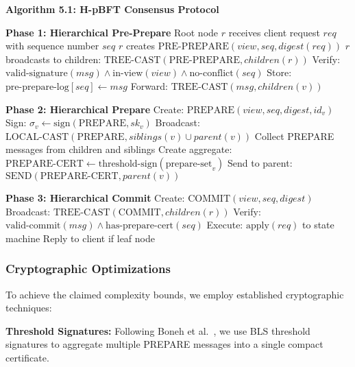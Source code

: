 \documentclass[conference]{IEEEtran}
\begin{document}
\textbf{Algorithm 5.1: H-pBFT Consensus Protocol}

\begin{algorithmic}[1]
\STATE \textbf{Phase 1: Hierarchical Pre-Prepare}
\STATE Root node $r$ receives client request $req$ with sequence number $seq$
\STATE $r$ creates $\text{PRE-PREPARE}(view, seq, digest(req))$ 
\STATE $r$ broadcasts to children: $\text{TREE-CAST}(\text{PRE-PREPARE}, children(r))$
    \STATE Verify: $\text{valid-signature}(msg) \land \text{in-view}(view) \land \text{no-conflict}(seq)$
    \STATE Store: $\text{pre-prepare-log}[seq] \gets msg$
    \STATE Forward: $\text{TREE-CAST}(msg, children(v))$
\ENDFOR

\STATE \textbf{Phase 2: Hierarchical Prepare}
    \STATE Create: $\text{PREPARE}(view, seq, digest, id_v)$
    \STATE Sign: $\sigma_v \gets \text{sign}(\text{PREPARE}, sk_v)$
    \STATE Broadcast: $\text{LOCAL-CAST}(\text{PREPARE}, siblings(v) \cup parent(v))$
\ENDFOR
{}
        \STATE Collect PREPARE messages from children and siblings
    \ENDWHILE
    \STATE Create aggregate: $\text{PREPARE-CERT} \gets \text{threshold-sign}(\text{prepare-set}_v)$
    \STATE Send to parent: $\text{SEND}(\text{PREPARE-CERT}, parent(v))$
\ENDFOR

\STATE \textbf{Phase 3: Hierarchical Commit}
    \STATE Create: $\text{COMMIT}(view, seq, digest)$
    \STATE Broadcast: $\text{TREE-CAST}(\text{COMMIT}, children(r))$
\ENDIF
{}
    \STATE Verify: $\text{valid-commit}(msg) \land \text{has-prepare-cert}(seq)$
    \STATE Execute: $\text{apply}(req)$ to state machine
    \STATE Reply to client if leaf node
\ENDFOR
\end{algorithmic}

\subsubsection{Cryptographic Optimizations}

To achieve the claimed complexity bounds, we employ established cryptographic techniques:

\textbf{Threshold Signatures:} Following Boneh et al.~\cite{boneh2001short}, we use BLS threshold signatures to aggregate multiple PREPARE messages into a single compact certificate.
\end{document}
